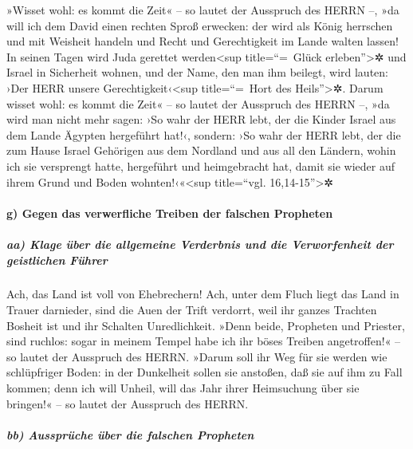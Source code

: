 »Wisset wohl: es kommt die Zeit« -- so lautet der
Ausspruch des HERRN --, »da will ich dem David einen rechten Sproß
erwecken: der wird als König herrschen und mit Weisheit handeln und
Recht und Gerechtigkeit im Lande walten lassen! In seinen
Tagen wird Juda gerettet werden\textless sup title=``=~Glück
erleben''\textgreater✲ und Israel in Sicherheit wohnen, und der Name,
den man ihm beilegt, wird lauten: ›Der HERR unsere
Gerechtigkeit‹\textless sup title=``=~Hort des Heils''\textgreater✲.
Darum wisset wohl: es kommt die Zeit« -- so lautet der
Ausspruch des HERRN --, »da wird man nicht mehr sagen: ›So wahr der HERR
lebt, der die Kinder Israel aus dem Lande Ägypten hergeführt hat!‹,
sondern: ›So wahr der HERR lebt, der die zum Hause Israel
Gehörigen aus dem Nordland und aus all den Ländern, wohin ich sie
versprengt hatte, hergeführt und heimgebracht hat, damit sie wieder auf
ihrem Grund und Boden wohnten!‹«\textless sup title=``vgl.
16,14-15''\textgreater✲

\hypertarget{g-gegen-das-verwerfliche-treiben-der-falschen-propheten}{%
\paragraph{g) Gegen das verwerfliche Treiben der falschen
Propheten}\label{g-gegen-das-verwerfliche-treiben-der-falschen-propheten}}

\hypertarget{aa-klage-uxfcber-die-allgemeine-verderbnis-und-die-verworfenheit-der-geistlichen-fuxfchrer}{%
\subparagraph{aa) Klage über die allgemeine Verderbnis und die
Verworfenheit der geistlichen
Führer}\label{aa-klage-uxfcber-die-allgemeine-verderbnis-und-die-verworfenheit-der-geistlichen-fuxfchrer}}


Ach, das Land ist voll von Ehebrechern! Ach, unter dem
Fluch liegt das Land in Trauer darnieder, sind die Auen der Trift
verdorrt, weil ihr ganzes Trachten Bosheit ist und ihr Schalten
Unredlichkeit. »Denn beide, Propheten und Priester, sind
ruchlos: sogar in meinem Tempel habe ich ihr böses Treiben angetroffen!«
-- so lautet der Ausspruch des HERRN. »Darum soll ihr Weg
für sie werden wie schlüpfriger Boden: in der Dunkelheit sollen sie
anstoßen, daß sie auf ihm zu Fall kommen; denn ich will Unheil, will das
Jahr ihrer Heimsuchung über sie bringen!« -- so lautet der Ausspruch des
HERRN.

\hypertarget{bb-ausspruxfcche-uxfcber-die-falschen-propheten}{%
\subparagraph{bb) Aussprüche über die falschen
Propheten}\label{bb-ausspruxfcche-uxfcber-die-falschen-propheten}}

